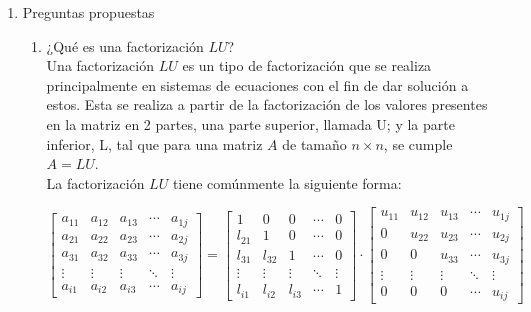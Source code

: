 \documentclass[english,notitlepage,letterpaper, 10pt]{article} %
\begin{document}
\begin{enumerate}
  \item Preguntas propuestas
        \begin{enumerate}
          \item ¿Qué es una factorización $LU$? \\
                Una factorización $LU$ es un tipo de factorización que se realiza principalmente en sistemas de ecuaciones con el fin de dar solución a estos. Esta se realiza a partir de la factorización de los valores presentes en la matriz en 2 partes, una parte superior, llamada U; y la parte inferior, L, tal que para una matriz $A$ de tamaño $n \times n$, se cumple $A=LU$. \\
                La factorización $LU$ tiene comúnmente la siguiente forma:

                \begin{equation}
                  \begin{bmatrix}
                    a_{11} & a_{12} & a_{13} & \cdots & a_{1j} \\
                    a_{21} & a_{22} & a_{23} & \cdots & a_{2j} \\
                    a_{31} & a_{32} & a_{33} & \cdots & a_{3j} \\
                    \vdots & \vdots & \vdots & \ddots & \vdots \\
                    a_{i1} & a_{i2} & a_{i3} & \cdots & a_{ij}
                  \end{bmatrix}
                  =
                  \begin{bmatrix}
                    1      & 0      & 0      & \cdots & 0      \\
                    l_{21} & 1      & 0      & \cdots & 0      \\
                    l_{31} & l_{32} & 1      & \cdots & 0      \\
                    \vdots & \vdots & \vdots & \ddots & \vdots \\
                    l_{i1} & l_{i2} & l_{i3} & \cdots & 1
                  \end{bmatrix}
                  \cdot
                  \begin{bmatrix}
                    u_{11} & u_{12} & u_{13} & \cdots & u_{1j} \\
                    0      & u_{22} & u_{23} & \cdots & u_{2j} \\
                    0      & 0      & u_{33} & \cdots & u_{3j} \\
                    \vdots & \vdots & \vdots & \ddots & \vdots \\
                    0      & 0      & 0      & \cdots & u_{ij}
                  \end{bmatrix}
                \end{equation}


\end{enumerate}
\end{enumerate}
\end{document}
